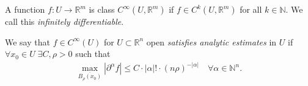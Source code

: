 \begin{definition}\label{def:class-infinity}
    A function $f: U \to \mathbb{R}^{m}$ is class $C^{\infty}(U, \mathbb{R}^{m})$ if $f \in C^{k}(U, \mathbb{R}^{m})$ for all $k \in \mathbb{N}$. We call this \textit{infinitely differentiable}.
\end{definition}

\begin{definition}\label{def:analytic-func}
    We say that $f \in C^{\infty}(U)$ for $U \subset \mathbb{R}^{n}$ open \textit{satisfies analytic estimates} in $U$ if $\forall x_{0} \in U \;  \exists C,\rho > 0$ such that
    \begin{align*}
        \max_{\overline{ B_{\rho}(x_{0}) } } \left| \partial^{\alpha }f \right| \leq C \cdot \left| \alpha \right|! \cdot (n \rho)^{-\left| \alpha  \right|} \quad  \forall \alpha \in \mathbb{N}^{n}.
    \end{align*}
\end{definition}
